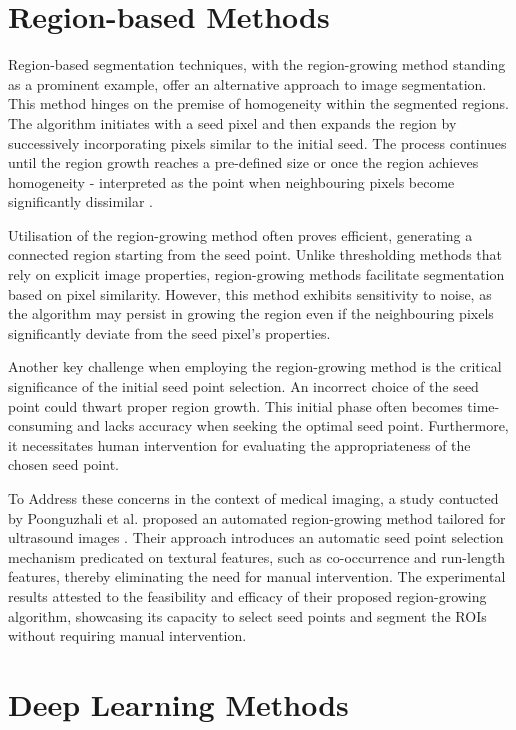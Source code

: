 \section{Region-based Methods}
Region-based segmentation techniques, with the region-growing method standing as a prominent example, offer an alternative approach to image segmentation. This method hinges on the premise of homogeneity within the segmented regions. The algorithm initiates with a seed pixel and then expands the region by successively incorporating pixels similar to the initial seed. The process continues until the region growth reaches a pre-defined size or once the region achieves homogeneity - interpreted as the point when neighbouring pixels become significantly dissimilar \cite{adams1994seeded}.

Utilisation of the region-growing method often proves efficient, generating a connected region starting from the seed point. Unlike thresholding methods that rely on explicit image properties, region-growing methods facilitate segmentation based on pixel similarity. However, this method exhibits sensitivity to noise, as the algorithm may persist in growing the region even if the neighbouring pixels significantly deviate from the seed pixel's properties.

Another key challenge when employing the region-growing method is the critical significance of the initial seed point selection. An incorrect choice of the seed point could thwart proper region growth. This initial phase often becomes time-consuming and lacks accuracy when seeking the optimal seed point. Furthermore, it necessitates human intervention for evaluating the appropriateness of the chosen seed point.

To Address these concerns in the context of medical imaging, a study contucted by Poonguzhali et al. proposed an automated region-growing method tailored for ultrasound images \cite{poonguzhali2006complete}. Their approach introduces an automatic seed point selection mechanism predicated on textural features, such as co-occurrence and run-length features, thereby eliminating the need for manual intervention. The experimental results attested to the feasibility and efficacy of their proposed region-growing algorithm, showcasing its capacity to select seed points and segment the ROIs without requiring manual intervention.

\section{Deep Learning Methods}
